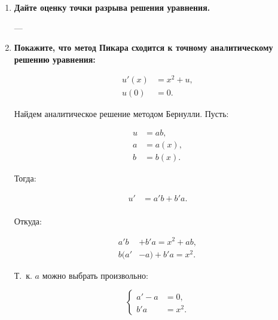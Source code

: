 \begin{enumerate}[label=\textbf{\arabic*})]
    \item \textbf{Дайте оценку точки разрыва решения уравнения.}

        ---


    \item \textbf{Покажите, что метод Пикара сходится к точному аналитическому решению
        уравнения:}

        \begin{equation*}
            \begin{aligned}
                u'(x) &= x^2 + u,\\
                u(0)~ &= 0.
            \end{aligned}
        \end{equation*}

        Найдем аналитическое решение методом Бернулли. Пусть:

        \begin{equation*}
            \begin{aligned}
                u &= ab,\\
                a &= a(x),\\
                b &= b(x).
            \end{aligned}
        \end{equation*}

        Тогда:

        \begin{equation*}
            \begin{aligned}
                u' &= a'b + b'a.\\
            \end{aligned}
        \end{equation*}

        Откуда:

        \begin{equation*}
            \begin{aligned}
                a'b &+ b'a = x^2 + ab,\\
                b(a' &- a) + b'a = x^2.
            \end{aligned}
        \end{equation*}

        Т.~к. $a$ можно выбрать произвольно:

        \begin{equation*}
            \begin{cases}
                a' - a &=0,\\
                b'a &= x^2.
            \end{cases}
        \end{equation*}


\end{enumerate}

